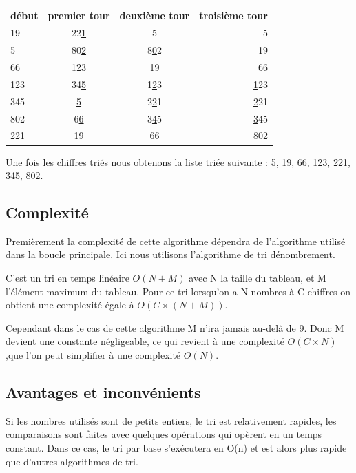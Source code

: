 \documentclass[12pt]{article}
\begin{document}
\vspace{0.5 cm}
\hspace{3.0 cm}
\begin{tabular}{|l|c|c|r|}
  \hline
  début & premier tour & deuxième tour & troisième tour\\
  \hline
  19  &	22\underline{1} & 5 & 5\\
   5  &	80\underline{2} & 8\underline{0}2  & 19\\
  66  &	12\underline{3} &	\underline{1}9 & 66\\
  123 &	34\underline{5} & 1\underline{2}3 & \underline{1}23\\
  345 &	\underline{5} & 2\underline{2}1 & \underline{2}21\\
  802 &	6\underline{6} & 3\underline{4}5 & \underline{3}45 \\
  221  &	1\underline{9} &\underline{6}6 & \underline{8}02 \\

  \hline
\end{tabular}

\vspace{1.0 cm}
Une fois les chiffres triés nous obtenons la liste triée suivante : 5, 19, 66, 123, 221, 345, 802.


\subsection{Complexité}

 \hspace{1.0 cm}Premièrement la complexité de cette algorithme dépendra
 de l'algorithme utilisé dans la boucle principale. Ici nous utilisons l'algorithme de tri dénombrement.
 
 
\hspace{1.0 cm}C'est un tri en temps linéaire $O(N+M)$ avec N la taille du tableau, et M
 l'élément maximum du tableau. Pour ce tri lorsqu'on a N nombres à C chiffres on obtient une complexité égale à $ O(C×(N+M))$. 
 
 
 \hspace{1.0 cm}Cependant dans le cas de cette algorithme M n'ira jamais au-delà de 9. Donc M devient une constante négligeable, ce qui revient à une complexité $O(C×N)$,que l'on peut simplifier à une complexité $O(N)$. 

\subsection{Avantages et inconvénients}
\hspace{1.0 cm} Si les nombres utilisés sont de petits entiers, le tri est relativement rapides, les comparaisons sont faites avec quelques opérations qui opèrent en un temps constant. Dans ce cas, le tri par base s'exécutera en O(n) et est alors plus rapide que d'autres algorithmes de tri.
\end{document}
